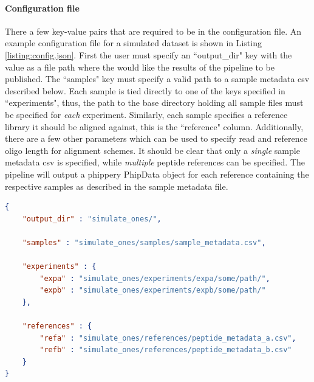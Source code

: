 \documentclass{article}
\begin{document}
\paragraph{Configuration file}
There a few key-value pairs that are required to be in the configuration file. 
An example configuration file for a simulated dataset is shown in Listing \ref{listing:config.json}.
First the user must specify an ``output\_dir" key with the value as a file path where the would like the results of the pipeline to be published.
The ``samples" key must specify a valid path to a sample metadata csv described below. 
Each sample is tied directly to one of the keys specified in ``experiments", 
thus, the path to the base directory holding all sample files must be specified for \textit{each} experiment.
Similarly, each sample specifies a reference library it should be aligned against, this is the ``reference" column.
Additionally, there are a few other parameters which can be used to specify read and reference oligo length for alignment schemes.
It should be clear that only a \textit{single} sample metadata csv is specified, while \textit{multiple} peptide references can be specified.
The pipeline will output a phippery PhipData object for each reference containing the respective samples as described in the sample metadata file.

\begin{lstlisting}[language=json,firstnumber=1,caption={An example JSON configuration file for a simulated dataset.},captionpos=b,numbers=none,label=listing:config.json]
{
    "output_dir" : "simulate_ones/",

    "samples" : "simulate_ones/samples/sample_metadata.csv",

    "experiments" : {
        "expa" : "simulate_ones/experiments/expa/some/path/",
        "expb" : "simulate_ones/experiments/expb/some/path/"
    },

    "references" : {
        "refa" : "simulate_ones/references/peptide_metadata_a.csv",
        "refb" : "simulate_ones/references/peptide_metadata_b.csv"
    }
}
\end{lstlisting}
\end{document}
